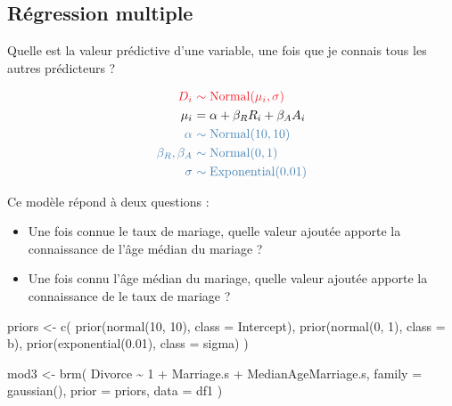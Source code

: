 \documentclass[
  a4paper,11pt,twoside,onecolumn,openright,final,oldfontcommands]{memoir}
\newenvironment{Shaded}{\begin{snugshade}}{\end{snugshade}}
\newcommand{\AttributeTok}[1]{\textcolor[rgb]{0.77,0.63,0.00}{#1}}
\newcommand{\DecValTok}[1]{\textcolor[rgb]{0.00,0.00,0.81}{#1}}
\newcommand{\FloatTok}[1]{\textcolor[rgb]{0.00,0.00,0.81}{#1}}
\newcommand{\FunctionTok}[1]{\textcolor[rgb]{0.00,0.00,0.00}{#1}}
\newcommand{\NormalTok}[1]{#1}
\newcommand{\OtherTok}[1]{\textcolor[rgb]{0.56,0.35,0.01}{#1}}
\newcommand{\SpecialCharTok}[1]{\textcolor[rgb]{0.00,0.00,0.00}{#1}}
\providecommand{\tightlist}{%
  \setlength{\itemsep}{0pt}\setlength{\parskip}{0pt}}
\theoremstyle{definition}
\theoremstyle{definition}
\theoremstyle{definition}
\theoremstyle{remark}
\begin{document}
\hypertarget{ruxe9gression-multiple-1}{%
\subsection{Régression multiple}\label{ruxe9gression-multiple-1}}

Quelle est la valeur prédictive d'une variable, une fois que je connais tous les autres prédicteurs ?

\[
\begin{aligned}
\color{orangered}{D_{i}} \ &\color{orangered}{\sim \mathrm{Normal}(\mu_{i}, \sigma)} \\
\color{black}{\mu_{i}} \ &\color{black}{= \alpha + \beta_{R}R_{i} + \beta_{A} A_{i}} \\
\color{steelblue}{\alpha} \ &\color{steelblue}{\sim \mathrm{Normal}(10, 10)} \\
\color{steelblue}{\beta_{R}, \beta_{A}} \ &\color{steelblue}{\sim \mathrm{Normal}(0, 1)} \\
\color{steelblue}{\sigma} \ &\color{steelblue}{\sim \mathrm{Exponential}(0.01)} \\
\end{aligned}
\]

Ce modèle répond à deux questions :

\begin{itemize}
\tightlist
\item
  Une fois connue le taux de mariage, quelle valeur ajoutée apporte la connaissance de l'âge médian du mariage ?
\item
  Une fois connu l'âge médian du mariage, quelle valeur ajoutée apporte la connaissance de le taux de mariage ?
\end{itemize}

\begin{Shaded}
\begin{Highlighting}[]
\NormalTok{priors }\OtherTok{\textless{}{-}} \FunctionTok{c}\NormalTok{(}
  \FunctionTok{prior}\NormalTok{(}\FunctionTok{normal}\NormalTok{(}\DecValTok{10}\NormalTok{, }\DecValTok{10}\NormalTok{), }\AttributeTok{class =}\NormalTok{ Intercept),}
  \FunctionTok{prior}\NormalTok{(}\FunctionTok{normal}\NormalTok{(}\DecValTok{0}\NormalTok{, }\DecValTok{1}\NormalTok{), }\AttributeTok{class =}\NormalTok{ b),}
  \FunctionTok{prior}\NormalTok{(}\FunctionTok{exponential}\NormalTok{(}\FloatTok{0.01}\NormalTok{), }\AttributeTok{class =}\NormalTok{ sigma)}
\NormalTok{  )}

\NormalTok{mod3 }\OtherTok{\textless{}{-}} \FunctionTok{brm}\NormalTok{(}
\NormalTok{  Divorce }\SpecialCharTok{\textasciitilde{}} \DecValTok{1} \SpecialCharTok{+}\NormalTok{ Marriage.s }\SpecialCharTok{+}\NormalTok{ MedianAgeMarriage.s,}
  \AttributeTok{family =} \FunctionTok{gaussian}\NormalTok{(),}
  \AttributeTok{prior =}\NormalTok{ priors,}
  \AttributeTok{data =}\NormalTok{ df1}
\NormalTok{  )}
\end{Highlighting}
\end{Shaded}
\end{document}
